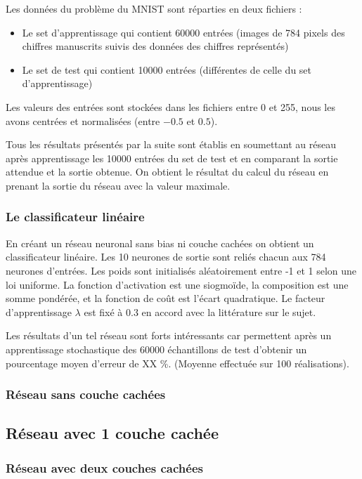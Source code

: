 Les données du problème du MNIST sont réparties en deux fichiers :
\begin{itemize}
    \item Le set d'apprentissage qui contient 60000 entrées (images de 784 pixels
          des chiffres manuscrits suivis des données des chiffres représentés)
    \item Le set de test qui contient 10000 entrées (différentes de celle du set
          d'apprentissage)
\end{itemize}

\medskip

Les valeurs des entrées sont stockées dans les fichiers entre 0 et 255, nous
les avons centrées et normalisées (entre $-0.5$ et $0.5$).

\medskip

Tous les résultats présentés par la suite sont établis en soumettant au réseau
après apprentissage les 10000 entrées du set de test et en comparant la sortie
attendue et la sortie obtenue. On obtient le résultat du calcul du réseau en
prenant la sortie du réseau avec la valeur maximale.

\subsubsection{Le classificateur linéaire}

En créant un réseau neuronal sans bias ni couche cachées on obtient un
classificateur linéaire. Les 10 neurones de sortie sont reliés chacun aux 784
neurones d'entrées. Les poids sont initialisés aléatoirement entre -1 et 1 selon
 une loi uniforme. La fonction d'activation est une siogmoïde, la composition
est une somme pondérée, et la fonction de coût est l'écart quadratique. Le
facteur d'apprentissage $\lambda$ est fixé à $0.3$ en accord avec la littérature
 sur le sujet.


\medskip

Les résultats d'un tel réseau sont forts intéressants car permettent après un
apprentissage stochastique des 60000 échantillons de test d'obtenir un
pourcentage moyen d'erreur de XX \%. (Moyenne effectuée sur 100 réalisations).


\subsubsection{Réseau sans couche cachées}

\subsection{Réseau avec 1 couche cachée}

\subsubsection{Réseau avec deux couches cachées}
